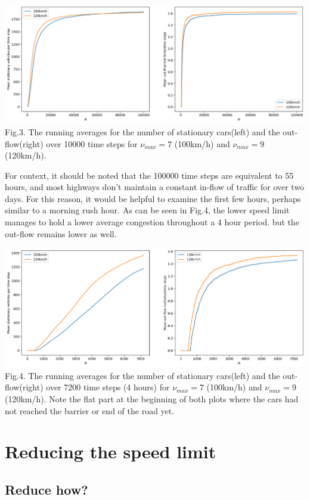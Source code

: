 \documentclass[11pt]{article}
\begin{document}
	\begin{center}
		\includegraphics[scale=0.46]{Figures/Plain_bottleneck_run1.png}\\
		Fig.3.	
		The running averages for the number of stationary cars(left) and the out-flow(right) over 10000 time steps for $\nu_{max}=7$ (100km/h) and $\nu_{max}=9$ (120km/h). \\
	\end{center}

	For context, it should be noted that the 100000 time steps are equivalent to 55 hours, and most highways don't maintain a constant in-flow of traffic for over two days. For this reason, it would be helpful to examine the first few hours, perhaps similar to a morning rush hour. As can be seen in Fig.4, the lower speed limit manages to hold a lower average congestion throughout a 4 hour period. but the out-flow remains lower as well.\\
	
	\begin{center}
		\includegraphics[scale=0.46]{Figures/Plain_bottleneck_run1_4hour.png}\\
		Fig.4.	
		The running averages for the number of stationary cars(left) and the out-flow(right) over 7200 time steps (4 hours) for $\nu_{max}=7$ (100km/h) and $\nu_{max}=9$ (120km/h). Note the flat part at the beginning of both plots where the cars had not reached the barrier or end of the road yet. \\
	\end{center}

	\section{Reducing the speed limit}\label{sec:limit}
	
	\subsection{Reduce how?}
	
	
	
	\newpage
	
	
	
	
\end{document}

